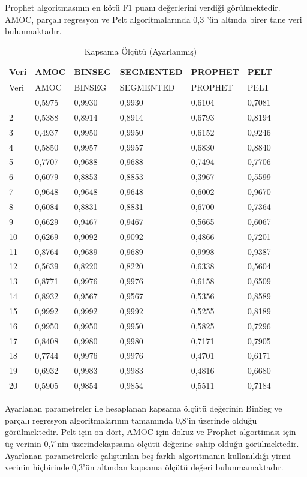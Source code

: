 \documentclass[12pt,twoside]{deuthesis}
\begin{document}
Prophet algoritmasının en kötü F1 puanı değerlerini verdiği görülmektedir. AMOC, parçalı regresyon ve Pelt algoritmalarında 0,3 'ün altında birer tane veri bulunmaktadır.

\begin{longtable}[]{@{}llllll@{}}
\caption{\label{tab:nvar11} Kapsama Ölçütü (Ayarlanmış)}\tabularnewline
\toprule\noalign{}
Veri & AMOC & BINSEG & SEGMENTED & PROPHET & PELT \\
\midrule\noalign{}
\endfirsthead
\toprule\noalign{}
Veri & AMOC & BINSEG & SEGMENTED & PROPHET & PELT \\
\midrule\noalign{}
\endhead
\bottomrule\noalign{}
\endlastfoot
1 & 0,5975 & 0,9930 & 0,9930 & 0,6104 & 0,7081 \\
2 & 0,5388 & 0,8914 & 0,8914 & 0,6793 & 0,8194 \\
3 & 0,4937 & 0,9950 & 0,9950 & 0,6152 & 0,9246 \\
4 & 0,5850 & 0,9957 & 0,9957 & 0,6830 & 0,8840 \\
5 & 0,7707 & 0,9688 & 0,9688 & 0,7494 & 0,7706 \\
6 & 0,6079 & 0,8853 & 0,8853 & 0,3967 & 0,5599 \\
7 & 0,9648 & 0,9648 & 0,9648 & 0,6002 & 0,9670 \\
8 & 0,6084 & 0,8831 & 0,8831 & 0,6700 & 0,7364 \\
9 & 0,6629 & 0,9467 & 0,9467 & 0,5665 & 0,6067 \\
10 & 0,6269 & 0,9092 & 0,9092 & 0,4866 & 0,7201 \\
11 & 0,8764 & 0,9689 & 0,9689 & 0,9998 & 0,9387 \\
12 & 0,5639 & 0,8220 & 0,8220 & 0,6338 & 0,5604 \\
13 & 0,8771 & 0,9976 & 0,9976 & 0,6158 & 0,6509 \\
14 & 0,8932 & 0,9567 & 0,9567 & 0,5356 & 0,8589 \\
15 & 0,9992 & 0,9992 & 0,9992 & 0,5255 & 0,8189 \\
16 & 0,9950 & 0,9950 & 0,9950 & 0,5825 & 0,7296 \\
17 & 0,8408 & 0,9980 & 0,9980 & 0,7171 & 0,7905 \\
18 & 0,7744 & 0,9976 & 0,9976 & 0,4701 & 0,6171 \\
19 & 0,6932 & 0,9983 & 0,9983 & 0,4816 & 0,6680 \\
20 & 0,5905 & 0,9854 & 0,9854 & 0,5511 & 0,7184 \\
\end{longtable}

Ayarlanan parametreler ile hesaplanan kapsama ölçütü değerinin BinSeg ve parçalı regresyon algoritmalarının tamamında 0,8'in üzerinde olduğu görülmektedir. Pelt için on dört, AMOC için dokuz ve Prophet algortiması için üç verinin 0,7'nin üzerindekapsama ölçütü değerine sahip olduğu görülmektedir. Ayarlanan parametrelerle çalıştırılan beş farklı algoritmanın kullanıldığı yirmi verinin hiçbirinde 0,3'ün altından kapsama ölçütü değeri bulunmamaktadır.
\end{document}
